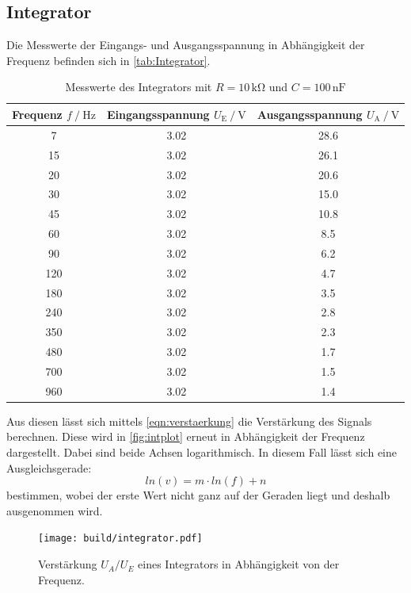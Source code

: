 \subsection{Integrator}
Die Messwerte der Eingangs- und Ausgangsspannung in Abhängigkeit der Frequenz befinden sich in \autoref{tab:Integrator}. 
\begin{table}
    \centering
    \caption{Messwerte des Integrators mit $R=10\,\unit{\kilo\ohm}$ und $C=100\,\unit{\nano\farad}$}
    \begin{tabular}{c c c}
        \toprule
        Frequenz $f\mathbin{/}\unit{\hertz}$ & Eingangsspannung $U_{\text{E}}\mathbin{/}\unit{\volt}$& Ausgangsspannung $U_{\text{A}}\mathbin{/}\unit{\volt}$ \\
        \midrule
        7& 3.02 & 28.6 \\
        15 & 3.02 & 26.1 \\
        20 & 3.02 & 20.6 \\
        30 & 3.02 & 15.0 \\
        45 & 3.02 & 10.8 \\
        60 & 3.02 & 8.5 \\
        90 & 3.02 & 6.2 \\
        120 & 3.02 & 4.7 \\
        180 & 3.02 & 3.5 \\
        240 & 3.02 & 2.8 \\
        350 & 3.02 & 2.3 \\
        480 & 3.02 & 1.7 \\
        700 & 3.02 & 1.5 \\
        960 & 3.02 & 1.4 \\
        \bottomrule
    \end{tabular}
    \label{tab:Integrator}
\end{table}
Aus diesen lässt sich mittels \autoref{eqn:verstaerkung} die Verstärkung des Signals berechnen. Diese wird in \autoref{fig:intplot} erneut
in Abhängigkeit der Frequenz dargestellt. Dabei sind beide Achsen logarithmisch. In diesem Fall lässt sich eine Ausgleichsgerade:
\begin{equation}
    ln(v) = m \cdot ln(f) + n
    \label{eqn:ausgleichger}
\end{equation} 
bestimmen, wobei der erste Wert nicht ganz auf der Geraden liegt und deshalb ausgenommen wird. 
\begin{figure}
    \centering
    \texttt{[image: build/integrator.pdf]}
    \caption{Verstärkung $U_A/U_E$ eines Integrators in Abhängigkeit von der Frequenz.}
    \label{fig:intplot}
\end{figure}
